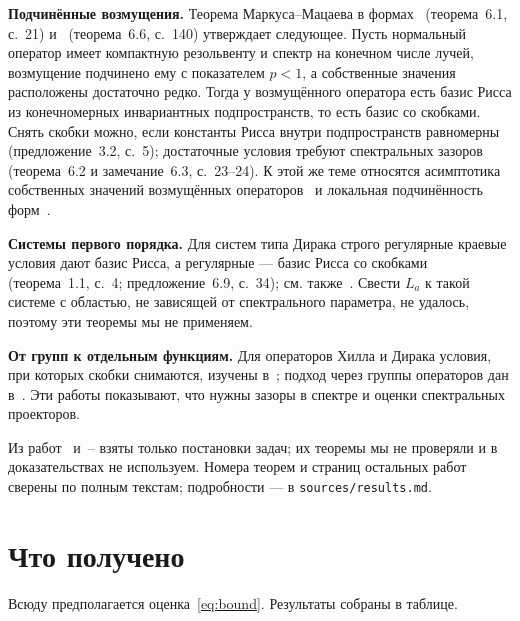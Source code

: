 \documentclass[12pt,a4paper]{article}
\begin{document}
\textbf{Подчинённые возмущения.} Теорема Маркуса--Мацаева в формах~\cite{S4}
(теорема~6.1, с.~21) и~\cite{S3} (теорема~6.6, с.~140) утверждает следующее. Пусть
нормальный оператор имеет компактную резольвенту и спектр на конечном числе лучей,
возмущение подчинено ему с показателем $p<1$, а собственные значения расположены
достаточно редко. Тогда у возмущённого оператора есть базис Рисса из конечномерных
инвариантных подпространств, то есть базис со скобками. Снять скобки можно, если
константы Рисса внутри подпространств равномерны~\cite{S4} (предложение~3.2, с.~5);
достаточные условия требуют спектральных зазоров~\cite{S4} (теорема~6.2 и замечание~6.3,
с.~23--24). К этой же теме относятся асимптотика собственных значений возмущённых
операторов~\cite{S20} и локальная подчинённость форм~\cite{S11,S12}.

\textbf{Системы первого порядка.} Для систем типа Дирака строго регулярные краевые
условия дают базис Рисса, а регулярные --- базис Рисса со скобками~\cite{S8}
(теорема~1.1, с.~4; предложение~6.9, с.~34); см. также~\cite{S7,S9,S10}. Свести $L_a$ к
такой системе с областью, не зависящей от спектрального параметра, не удалось, поэтому
эти теоремы мы не применяем.

\textbf{От групп к отдельным функциям.} Для операторов Хилла и Дирака условия, при
которых скобки снимаются, изучены в~\cite{S13,S14,S15,S16,S17,S18,S21}; подход через
группы операторов дан в~\cite{S19}. Эти работы показывают, что нужны зазоры в спектре и
оценки спектральных проекторов.

Из работ~\cite{S7} и~\cite{S9}--\cite{S21} взяты только постановки задач; их теоремы мы не
проверяли и в доказательствах не используем. Номера теорем и страниц остальных работ
сверены по полным текстам; подробности --- в \texttt{sources/results.md}.

\section{Что получено}
Всюду предполагается оценка~\eqref{eq:bound}. Результаты собраны в таблице.
\end{document}
